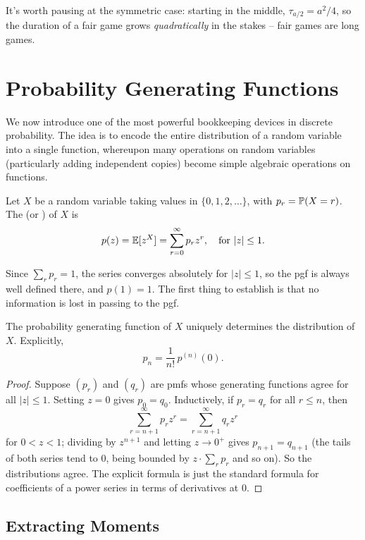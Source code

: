 \documentclass[a4paper]{scrartcl}
\begin{document}
It's worth pausing at the symmetric case: starting in the middle, $\tau_{a/2} = a^2/4$, so the duration of a fair game grows \emph{quadratically} in the stakes -- fair games are long games.


\section{Probability Generating Functions}

We now introduce one of the most powerful bookkeeping devices in discrete probability. The idea is to encode the entire distribution of a random variable into a single function, whereupon many operations on random variables (particularly adding independent copies) become simple algebraic operations on functions.

\begin{definition}
	Let $X$ be a random variable taking values in $\{0, 1, 2, \dots\}$, with $p_r = \mathbb{P}(X = r)$. The  (or ) of $X$ is
	$$
	p(z) = \mathbb{E}[z^X] = \sum_{r = 0}^{\infty} p_r z^r, \quad \text{for } |z| \leq 1.
	$$
\end{definition}

Since $\sum_r p_r = 1$, the series converges absolutely for $|z| \leq 1$, so the pgf is always well defined there, and $p(1) = 1$. The first thing to establish is that no information is lost in passing to the pgf.

\begin{theorem}
	The probability generating function of $X$ uniquely determines the distribution of $X$. Explicitly,
	$$
	p_n = \frac{1}{n!}\, p^{(n)}(0).
	$$
\end{theorem}
\begin{proof}
	Suppose $(p_r)$ and $(q_r)$ are pmfs whose generating functions agree for all $|z| \leq 1$. Setting $z = 0$ gives $p_0 = q_0$. Inductively, if $p_r = q_r$ for all $r \leq n$, then
	$$
	\sum_{r = n + 1}^{\infty} p_r z^r = \sum_{r = n+1}^{\infty} q_r z^r
	$$
	for $0 < z < 1$; dividing by $z^{n + 1}$ and letting $z \rightarrow 0^+$ gives $p_{n + 1} = q_{n+1}$ (the tails of both series tend to $0$, being bounded by $z \cdot \sum_r p_r$ and so on). So the distributions agree. The explicit formula is just the standard formula for coefficients of a power series in terms of derivatives at $0$.
\end{proof}

\subsection{Extracting Moments}
\end{document}
